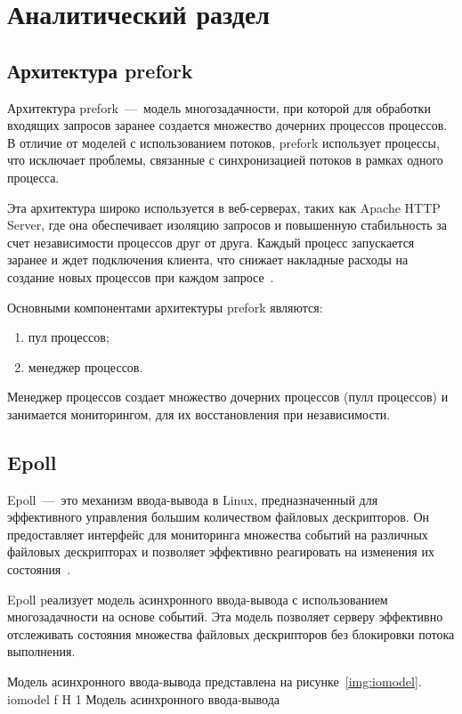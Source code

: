 \chapter{Аналитический раздел} 

\section{Архитектура prefork}

Архитектура prefork~---~модель многозадачности, при которой для обработки входящих запросов заранее создается множество дочерних процессов процессов. 
В отличие от моделей с использованием потоков, prefork использует процессы, что исключает проблемы, связанные с синхронизацией потоков в рамках одного процесса.

Эта архитектура широко используется в веб-серверах, таких как Apache HTTP Server, где она обеспечивает изоляцию запросов и повышенную стабильность за счет независимости процессов друг от друга. 
Каждый процесс запускается заранее и ждет подключения клиента, что снижает накладные расходы на создание новых процессов при каждом запросе~\cite{prefork}. 

Основными компонентами архитектуры prefork являются:
\begin{enumerate}
	\item пул процессов;
	\item менеджер процессов.
\end{enumerate}

Менеджер процессов создает множество дочерних процессов (пулл процессов) и занимается мониторингом, для их восстановления при независимости.
\clearpage

\section{Epoll}

Epoll~---~это механизм ввода-вывода в Linux, предназначенный для эффективного управления большим количеством файловых дескрипторов. 
Он предоставляет интерфейс для мониторинга множества событий на различных файловых дескрипторах и позволяет эффективно реагировать на изменения их состояния~\cite{epoll}.

Epoll pеализует модель асинхронного ввода-вывода с использованием многозадачности на основе событий. 
Эта модель позволяет серверу эффективно отслеживать состояния множества файловых дескрипторов без блокировки потока выполнения.

Модель асинхронного ввода-вывода представлена на рисунке~\ref{img:iomodel}.
	{iomodel}
	{f}
	{H}
	{1\textwidth}
	{Модель асинхронного ввода-вывода}

	